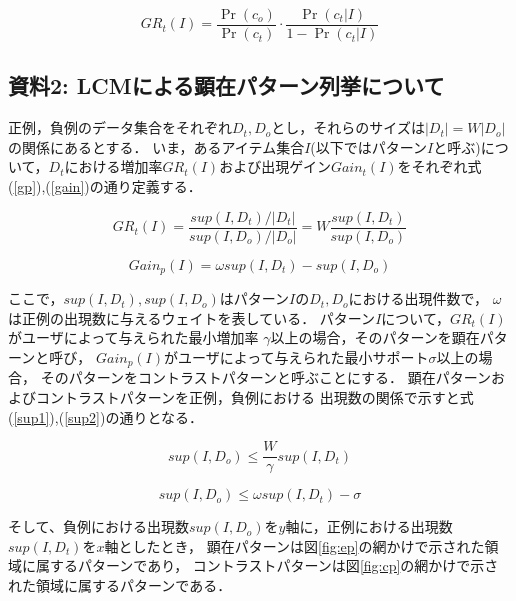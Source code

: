 \documentclass[a4paper]{jarticle}
\begin{document}
\begin{equation}
GR_t(I)=\frac{\Pr(c_o)}{\Pr(c_t)}\cdot \frac{\Pr(c_t|I)}{1-\Pr(c_t|I)} \label{relgrpost}
\end{equation}

\subsection*{資料2: LCMによる顕在パターン列挙について}

正例，負例のデータ集合をそれぞれ$D_t,D_o$とし，それらのサイズは$|D_t|=W |D_o|$の関係にあるとする．
いま，あるアイテム集合$I$(以下ではパターン$I$と呼ぶ)について，$D_t$における増加率$GR_t(I)$および出現ゲイン$Gain_t(I)$をそれぞれ式(\ref{gp}),(\ref{gain})の通り定義する．

\begin{equation}
GR_t(I)=\frac{sup(I,D_t)/|D_t|}{sup(I,D_o)/|D_o|}=W\frac{sup(I,D_t)}{sup(I,D_o)} \label{gp}
\end{equation}

\begin{equation}
Gain_p(I)=\omega sup(I,D_t) - sup(I,D_o) \label{gain}
\end{equation}

ここで，$sup(I,D_t),sup(I,D_o)$はパターン$I$の$D_t,D_o$における出現件数で，
$\omega$は正例の出現数に与えるウェイトを表している．
パターン$I$について，$GR_t(I)$がユーザによって与えられた最小増加率
$\gamma$以上の場合，そのパターンを顕在パターンと呼び，
$Gain_p(I)$がユーザによって与えられた最小サポート$\sigma$以上の場合，
そのパターンをコントラストパターンと呼ぶことにする．
顕在パターンおよびコントラストパターンを正例，負例における
出現数の関係で示すと式(\ref{sup1}),(\ref{sup2})の通りとなる．

\begin{equation}
sup(I,D_o)\le \frac{W}{\gamma} sup(I,D_t) \label{sup1}
\end{equation}

\begin{equation}
sup(I,D_o)\le \omega sup(I,D_t) - \sigma \label{sup2}
\end{equation}

そして、負例における出現数$sup(I,D_o)$を$y$軸に，正例における出現数$sup(I,D_t)$を$x$軸としたとき，
顕在パターンは図\ref{fig:ep}の網かけで示された領域に属するパターンであり，
コントラストパターンは図\ref{fig:cp}の網かけで示された領域に属するパターンである．
\end{document}
